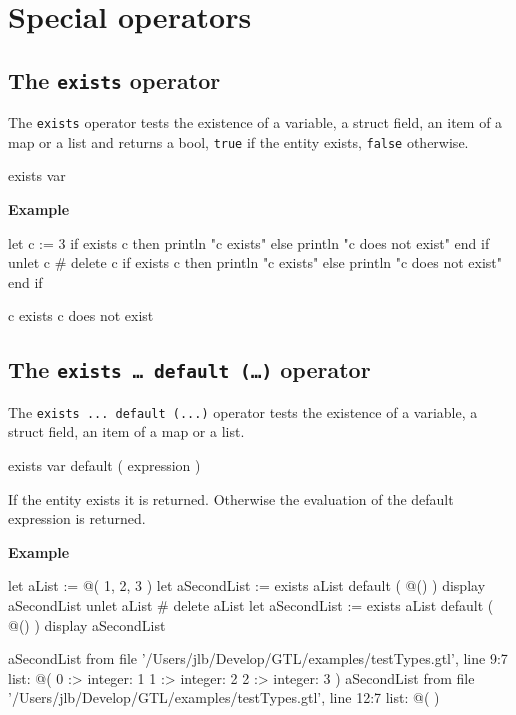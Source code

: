 \documentclass[10pt,openright,twosides,final]{memoir}
\newcommand{\gtlinline}[1]{\colorbox{light-blue}{\lstinline[language=gtl]{#1}}}
\newcommand{\example}{\vspace{.75em}\noindent\textbf{Example}\vspace{0em}}
\begin{document}
\section{Special operators}

\subsection{The \texttt{exists} operator}

The \gtlinline{exists} operator tests the existence of a variable, a struct field,  an item of a map or a list and returns a bool, \gtlinline{true} if the entity exists, \gtlinline{false} otherwise.

\begin{gtl}
exists var
\end{gtl}

\example
\begin{gtl}
let c := 3
if exists c then println "c exists" else println "c does not exist" end if
unlet c # delete c
if exists c then println "c exists" else println "c does not exist" end if
\end{gtl}
\begin{console}
c exists
c does not exist
\end{console}

\subsection{The \texttt{exists \ldots{} default (\ldots)} operator}

The \gtlinline{exists ... default (...)} operator tests the existence of a variable, a struct field,  an item of a map or a list.

\begin{gtl}
exists var default ( expression )
\end{gtl}

If the entity exists it is returned. Otherwise the evaluation of the default expression is returned.

\example
\begin{gtl}
let aList := @( 1, 2, 3 )
let aSecondList := exists aList default ( @() )
display aSecondList
unlet aList # delete aList
let aSecondList := exists aList default ( @() )
display aSecondList
\end{gtl}
\begin{console}
aSecondList from file '/Users/jlb/Develop/GTL/examples/testTypes.gtl', line 9:7
    list: @(
        0 :>
            integer: 1
        1 :>
            integer: 2
        2 :>
            integer: 3
    )
aSecondList from file '/Users/jlb/Develop/GTL/examples/testTypes.gtl', line 12:7
    list: @(
    )
\end{console}
\end{document}

